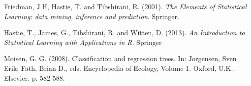 \documentclass[12pt,twoside]{article}
\begin{document}
\begin{thebibliography}{100}
 Friedman, J.H, Hastie, T. and Tibshirani, R. (2001).
\textit{The Elements of Statistical Learning: data mining, inference and prediction}. Springer.

 Hastie, T., James, G., Tibshirani, R. and Witten, D. (2013).
\textit{An Introduction to Statistical Learning with Applications in R}. Springer



 Moisen, G. G. (2008). Classification and regression trees. In: Jorgensen, Sven Erik; Fath, Brian D., eds. Encyclopedia of Ecology, Volume 1. Oxford, U.K.: Elsevier. p. 582-588.

\end{thebibliography}
\end{document}
